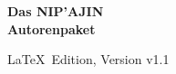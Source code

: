 
\begin{titlepage}
 
\thispagestyle{empty}

\begin{center}

\vspace*{40mm}

{\fontsize{56pt}{50pt}\selectfont\textbf{%
\color{Nebenfarbe}Das \color{Hauptfarbe}NIP'AJIN\\%
\color{Hauptfarbe}Autorenpaket%
}}

\vspace*{10mm}

{\LaTeX~Edition, Version v1.1}

\vfill  

\end{center}

\end{titlepage}